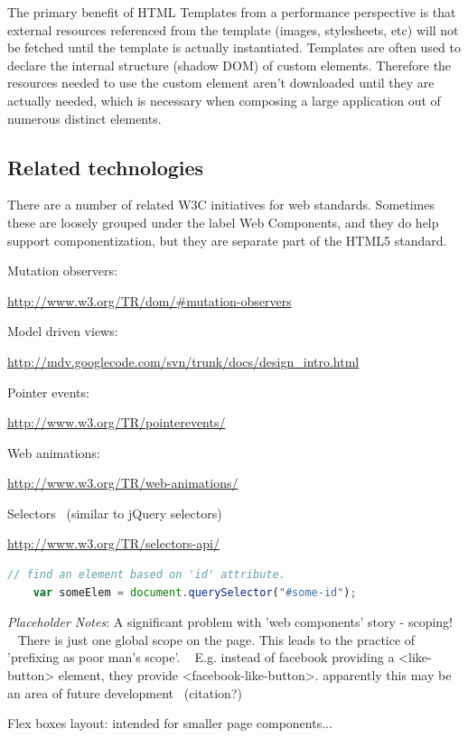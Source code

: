 The primary benefit of HTML Templates from a performance perspective is that external resources referenced from the template (images, stylesheets, etc) will not be fetched until the template is actually instantiated.
Templates are often used to declare the internal structure (shadow DOM) of custom elements. 
Therefore the resources needed to use the custom element aren't downloaded until they are actually needed, which is necessary when composing a large application out of numerous distinct elements.



\subsection{Related technologies}
There are a number of related W3C initiatives for web standards. 
Sometimes these are loosely grouped under the label Web Components,
and they do help support componentization, 
but they are separate part of the HTML5 standard.

Mutation observers:

\url{http://www.w3.org/TR/dom/#mutation-observers}

Model driven views:

\url{http://mdv.googlecode.com/svn/trunk/docs/design_intro.html}

Pointer events:

\url{http://www.w3.org/TR/pointerevents/}

Web animations:

\url{http://www.w3.org/TR/web-animations/}

Selectors  (similar to jQuery selectors)

\url{http://www.w3.org/TR/selectors-api/}

\begin{lstlisting}[language=JavaScript,numbers=none]
	// find an element based on 'id' attribute.
	var someElem = document.querySelector("#some-id");
\end{lstlisting}

\textit{Placeholder Notes}:
A significant problem with 'web components' story - scoping!  
There is just one global scope on the page.
This leads to the practice of 'prefixing as poor man's scope'.  
E.g. instead of facebook providing a <like-button> element, they provide <facebook-like-button>.
apparently this may be an area of future development  (citation?)

Flex boxes layout: intended for smaller page components...


